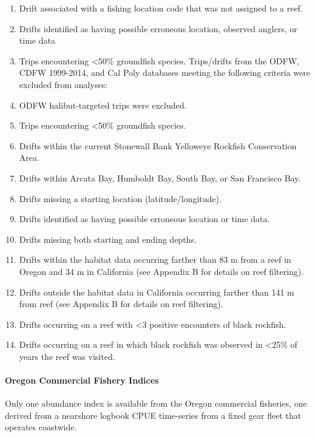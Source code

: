 \documentclass[11pt,
  english,
  letterpaper,
]{article}
\providecommand{\tightlist}{%
  \setlength{\itemsep}{0pt}\setlength{\parskip}{0pt}}
\providecommand{\tightlist}{%
  \setlength{\itemsep}{0pt}\setlength{\parskip}{0pt}}
\begin{document}
\begin{enumerate}
\def\labelenumi{\arabic{enumi}.}
\tightlist
\item
  Drift associated with a fishing location code that was not assigned to a reef.
\item
  Drifts identified as having possible erroneous location, observed anglers, or time data
\item
  Trips encountering \textless50\% groundfish species. Trips/drifts from the ODFW, CDFW 1999-2014, and Cal Poly databases meeting the following criteria were excluded from analyses:
\item
  ODFW halibut-targeted trips were excluded.
\item
  Trips encountering \textless50\% groundfish species.
\item
  Drifts within the current Stonewall Bank Yelloweye Rockfish Conservation Area.
\item
  Drifts within Arcata Bay, Humboldt Bay, South Bay, or San Francisco Bay.
\item
  Drifts missing a starting location (latitude/longitude).
\item
  Drifts identified as having possible erroneous location or time data.
\item
  Drifts missing both starting and ending depths.
\item
  Drifts within the habitat data occurring farther than 83 m from a reef in Oregon and 34 m in California (see Appendix B for details on reef filtering).
\item
  Drifts outside the habitat data in California occurring farther than 141 m from reef (see Appendix B for details on reef filtering).
\item
  Drifts occurring on a reef with \textless3 positive encounters of black rockfish.
\item
  Drifts occurring on a reef in which black rockfish was observed in \textless25\% of years the reef was visited.
\end{enumerate}

\hypertarget{oregon-commercial-fishery-indices}{%
\paragraph{Oregon Commercial Fishery Indices}\label{oregon-commercial-fishery-indices}}

Only one abundance index is available from the Oregon commercial fisheries, one derived from a nearshore logbook CPUE time-series from a fixed gear fleet that operates coastwide.
\end{document}
